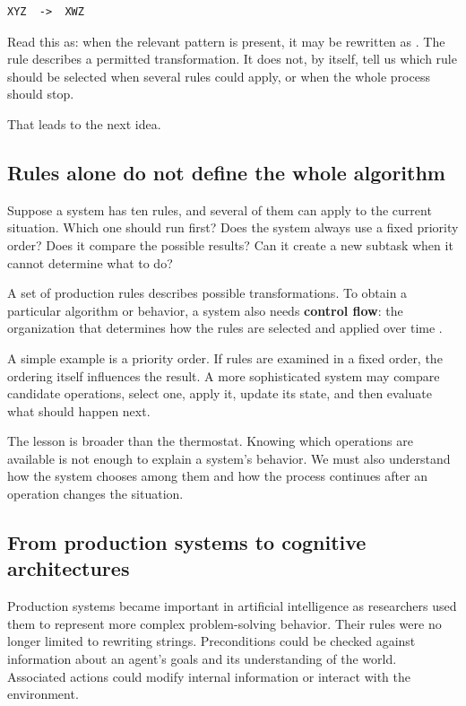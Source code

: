 \begin{lstlisting}
XYZ  ->  XWZ
\end{lstlisting}

Read this as: when the relevant pattern  is present, it may be rewritten as . The rule describes a permitted transformation. It does not, by itself, tell us which rule should be selected when several rules could apply, or when the whole process should stop.

That leads to the next idea.

\subsection{Rules alone do not define the whole algorithm}\label{rules-alone-do-not-define-the-whole-algorithm}

Suppose a system has ten rules, and several of them can apply to the current situation. Which one should run first? Does the system always use a fixed priority order? Does it compare the possible results? Can it create a new subtask when it cannot determine what to do?

A set of production rules describes possible transformations. To obtain a particular algorithm or behavior, a system also needs \textbf{control flow}: the organization that determines how the rules are selected and applied over time .

A simple example is a priority order. If rules are examined in a fixed order, the ordering itself influences the result. A more sophisticated system may compare candidate operations, select one, apply it, update its state, and then evaluate what should happen next.

The lesson is broader than the thermostat. Knowing which operations are available is not enough to explain a system's behavior. We must also understand how the system chooses among them and how the process continues after an operation changes the situation.

\subsection{From production systems to cognitive architectures}\label{from-production-systems-to-cognitive-architectures}

Production systems became important in artificial intelligence as researchers used them to represent more complex problem-solving behavior. Their rules were no longer limited to rewriting strings. Preconditions could be checked against information about an agent's goals and its understanding of the world. Associated actions could modify internal information or interact with the environment.

